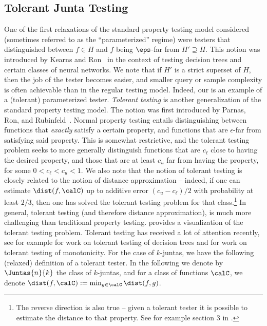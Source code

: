 \subsection{Tolerant Junta Testing}

One of the first relaxations of the standard property testing model considered (sometimes referred to as the ``parameterized'' regime) were testers that distinguished between $f \in H$ and $f$ being $\eps$-far from $H'\supseteq H$. This notion was introduced by Kearns and Ron~\cite{DBLP:journals/jcss/KearnsR00} in the context of testing decision trees and certain classes of neural networks. We note that if $H'$ is a strict superset of $H$, then the job of the tester becomes easier, and smaller query or sample complexity is often achievable than in the regular testing model. Indeed, our  is an example of a (tolerant) parameterized tester.
\textit{Tolerant testing} is another generalization of the standard property testing model. The notion was first introduced by Parnas, Ron, and Rubinfeld~\cite{og-tolerant}. 
Normal property testing entails distinguishing between functions that \textit{exactly} satisfy a certain property, and functions that are $\epsilon$-far from satisfying said property. 
This is somewhat restrictive, and the tolerant testing problem seeks to more generally distinguish functions that are $c_\ell$ close to having the desired property, and those that are at least $c_u$ far from having the property, for some $0 < c_\ell < c_u < 1$.  
We also note that the notion of tolerant testing is closely related to the notion of distance approximation -- indeed, if one can estimate $\dist(f, \calC)$ up to additive error $(c_u - c_\ell)/2$ with probability at least $2/3$, then one has solved the tolerant testing problem for that class.\footnote{The reverse direction is also true -- given a tolerant tester it is possible to estimate the distance to that property. See for example section 3 in \cite{ailon-chazelle-monotonicity-tolerant}.} In general, tolerant testing (and therefore distance approximation), is much more challenging than traditional property testing.  provides a visualization of the tolerant testing problem. 
Tolerant testing has received a lot of attention recently, see for example \cite{LYT-testing-reconstruction-DTs} for work on tolerant testing of decision trees and \cite{ailon-chazelle-monotonicity-tolerant} \cite{junta-lbs-PRW20} for work on tolerant testing of monotonicity. For the case of $k$-juntas, we have the following (relaxed) definition of a tolerant tester. In the following we denote by $\Juntas{n}{k}$ the class of $k$-juntas, and for a class of functions $\calC$, we denote $\dist(f,\calC) := \min_{g\in \calC}\dist(f,g)$.
